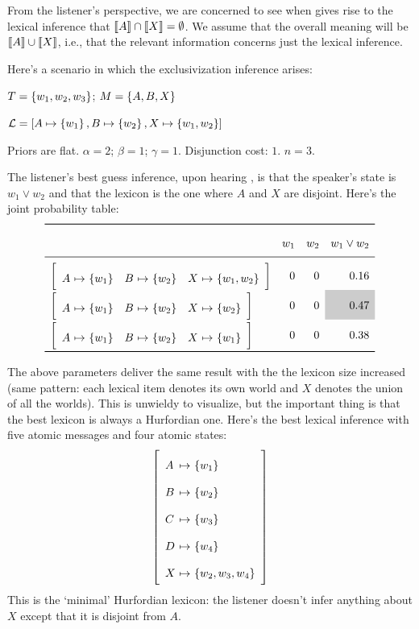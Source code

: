 \documentclass{article}
\begin{document}
\begin{examples}
\item From the listener's perspective, we are concerned to see when
   gives rise to the lexical inference that $\llbracket A\rrbracket \cap
  \llbracket X\rrbracket = \emptyset$. We assume that the overall meaning will be
  $\llbracket A\rrbracket \cup \llbracket X\rrbracket$, i.e., that the relevant information concerns
  just the lexical inference.

\item Here's a scenario in which the exclusivization inference arises:

  \begin{examples}
  \item $T = \left\{ w_{1}, w_{2}, w_{3} \right\}$;  $M = \left\{ A, B, X \right\}$
  \item $\mathcal{L} = [A \mapsto \left\{ w_{1} \right\}, B \mapsto \left\{ w_{2} \right\}, X \mapsto \left\{ w_{1}, w_{2} \right\}]$
  \item Priors are flat. $\alpha = 2$; $\beta = 1$; $\gamma = 1$. Disjunction cost: $1$. $n = 3$. 
  \end{examples}

\item The listener's best guess inference, upon hearing ,
  is that the speaker's state is $w_{1} \vee w_{2}$ and that the
  lexicon is the one where $A$ and $X$ are disjoint. Here's the joint
  probability table:
  \[
  \renewcommand{\arraystretch}{2}
  \begin{array}[c]{l r r r}
    \toprule
            & w_{1} & w_{2} & w_{1} \vee w_{2} \\
    \midrule
    \smallhurfordlex{w_{1}}{w_{2}}{w_{1}, w_{2}} & 0 & 0 & 0.16 \\
    \smallhurfordlex{w_{1}}{w_{2}}{w_{2}} & 0 & 0 & \graycell{0.47} \\
    \smallhurfordlex{w_{1}}{w_{2}}{w_{1}} & 0 & 0 & 0.38 \\
    \bottomrule
  \end{array}
  \]

\item The above parameters deliver the same result with the the
  lexicon size increased (same pattern: each lexical item denotes its
  own world and $X$ denotes the union of all the worlds). This is
  unwieldy to visualize, but the important thing is that the best
  lexicon is always a Hurfordian one. Here's the best lexical
  inference with five atomic messages and four atomic states:
  \[
  \left[
    \begin{array}[c]{l@{ \ \mapsto \ }l}
      A & \set{w_{1}} \\
      B & \set{w_{2}} \\
      C & \set{w_{3}} \\
      D & \set{w_{4}} \\
      X & \set{w_{2}, w_{3}, w_{4}}
    \end{array}
  \right]
  \]
  This is the `minimal' Hurfordian lexicon: the listener doesn't infer
  anything about $X$ except that it is disjoint from $A$.    
\end{examples}
\end{document}
